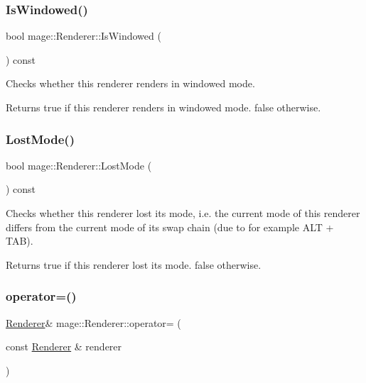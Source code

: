 \subsubsection{\texorpdfstring{Is\+Windowed()}{IsWindowed()}}
{\footnotesize\ttfamily bool mage\+::\+Renderer\+::\+Is\+Windowed (\begin{DoxyParamCaption}{ }\end{DoxyParamCaption}) const}

Checks whether this renderer renders in windowed mode.

\begin{DoxyReturn}{Returns}
{\ttfamily true} if this renderer renders in windowed mode. {\ttfamily false} otherwise. 
\end{DoxyReturn}
\hypertarget{classmage_1_1_renderer_afdde83a1e2bc9288f000fb2575c525d0}{}\label{classmage_1_1_renderer_afdde83a1e2bc9288f000fb2575c525d0} 
\subsubsection{\texorpdfstring{Lost\+Mode()}{LostMode()}}
{\footnotesize\ttfamily bool mage\+::\+Renderer\+::\+Lost\+Mode (\begin{DoxyParamCaption}{ }\end{DoxyParamCaption}) const}

Checks whether this renderer lost its mode, i.\+e. the current mode of this renderer differs from the current mode of its swap chain (due to for example A\+LT + T\+AB).

\begin{DoxyReturn}{Returns}
{\ttfamily true} if this renderer lost its mode. {\ttfamily false} otherwise. 
\end{DoxyReturn}
\hypertarget{classmage_1_1_renderer_a2762ead5f771ae95e4293cd7eb1a2834}{}\label{classmage_1_1_renderer_a2762ead5f771ae95e4293cd7eb1a2834} 
\subsubsection{\texorpdfstring{operator=()}{operator=()}\hspace{0.1cm}{\footnotesize\ttfamily [1/2]}}
{\footnotesize\ttfamily \hyperlink{classmage_1_1_renderer}{Renderer}\& mage\+::\+Renderer\+::operator= (\begin{DoxyParamCaption}\item[{const \hyperlink{classmage_1_1_renderer}{Renderer} \&}]{renderer }\end{DoxyParamCaption})\hspace{0.3cm}{\ttfamily [delete]}}

